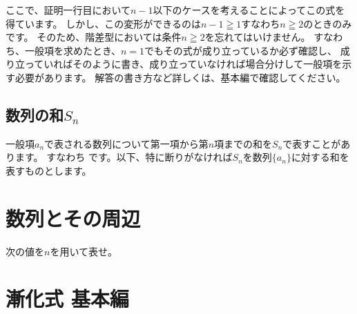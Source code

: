 \documentclass[a4paper]{ltjsarticle}
\begin{document}
ここで、証明一行目において$n-1$以下のケースを考えることによってこの式を得ています。
しかし、この変形ができるのは$n-1\geqq 1$すなわち$n\geqq 2$のときのみです。
そのため、階差型においては条件$n\geqq 2$を忘れてはいけません。
すなわち、一般項を求めたとき、$n=1$でもその式が成り立っているか必ず確認し、
成り立っていればそのように書き、成り立っていなければ場合分けして一般項を示す必要があります。
解答の書き方など詳しくは、基本編で確認してください。


\subsection{数列の和$S_n$}
一般項$a_n$で表される数列について第一項から第$n$項までの和を$S_n$で表すことがあります。
すなわち
です。以下、特に断りがなければ$S_n$を数列$\{a_n\}$に対する和を表すものとします。

\clearpage
\section{数列とその周辺}
\begin{question*}
  次の値を$n$を用いて表せ。
\end{question*}

\clearpage
\section{漸化式 基本編}
\end{document}
